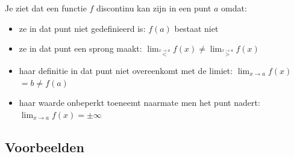 Je ziet dat een functie $f$ discontinu kan zijn in een
punt $a$ omdat:
\begin{itemize}
\item ze in dat punt niet gedefinieerd is: $f(a)$ bestaat niet
\item ze in dat punt een sprong maakt: $\lim_{\overset{x\rightarrow a}{<}}f(x)$$\neq\lim_{\overset{x\rightarrow a}{>}}f(x)$
\item haar definitie in dat punt niet overeenkomt met de limiet: $\lim_{x\to a}f(x)$$=b\neq f(a)$ 
\item haar waarde onbeperkt toeneemt naarmate men het punt nadert: $\lim_{x\to a}f(x)$$=\pm\infty$ 
\end{itemize}

\subsection{Voorbeelden}

